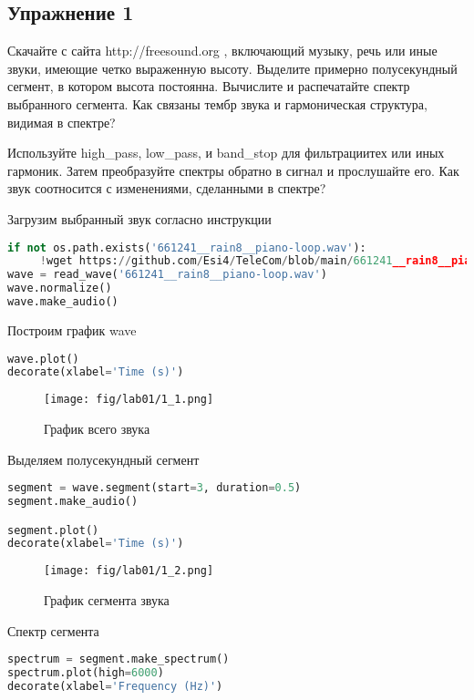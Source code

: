 \subsection{Упражнение 1}

Скачайте с сайта http://freesound.org , включающий музыку, речь или иные звуки, имеющие четко выраженную высоту. Выделите примерно полусекундный сегмент, в котором высота постоянна. Вычислите и распечатайте спектр выбранного сегмента. Как связаны тембр звука и гармоническая структура, видимая в спектре?


\noindent Используйте high\_pass, low\_pass, и band\_stop для фильтрациитех или иных гармоник. Затем преобразуйте спектры обратно в сигнал и прослушайте его. Как звук соотносится с изменениями, сделанными в спектре?
    

Загрузим выбранный звук согласно инструкции

\begin{lstlisting}[language=Python]
if not os.path.exists('661241__rain8__piano-loop.wav'):
     !wget https://github.com/Esi4/TeleCom/blob/main/661241__rain8__piano-loop.wav
wave = read_wave('661241__rain8__piano-loop.wav')
wave.normalize()
wave.make_audio()
\end{lstlisting}

Построим график wave
\begin{lstlisting}[language=Python]
wave.plot()
decorate(xlabel='Time (s)')
\end{lstlisting}

\begin{figure}[H]
	\begin{center}
		\texttt{[image: fig/lab01/1\_1.png]}
		\caption{График всего звука}
	\end{center}
\end{figure}

Выделяем полусекундный сегмент
\begin{lstlisting}[language=Python]
segment = wave.segment(start=3, duration=0.5)
segment.make_audio()

segment.plot()
decorate(xlabel='Time (s)')
\end{lstlisting}

\begin{figure}[H]
	\begin{center}
		\texttt{[image: fig/lab01/1\_2.png]}
		\caption{График сегмента звука}
	\end{center}
\end{figure}

Спектр сегмента
\begin{lstlisting}[language=Python]
spectrum = segment.make_spectrum()
spectrum.plot(high=6000)
decorate(xlabel='Frequency (Hz)')
\end{lstlisting}

